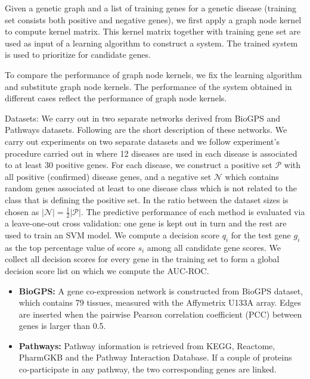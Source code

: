 \documentclass[review]{elsarticle}
\begin{document}
Given a genetic graph and a list of training genes for a genetic disease (training set consists both positive and negative genes), we first apply  a graph node kernel to compute kernel matrix. This kernel matrix together with training gene set are used as input of a learning algorithm to construct a system. The trained system is used to prioritize for candidate genes.

To compare the performance of graph node kernels, we fix the learning algorithm and substitute graph node kernels. The performance of the system obtained in different cases reflect the performance of graph node kernels.




Datasets: We carry out in two separate networks derived from BioGPS and Pathways datasets. Following are the short description of these networks.
We carry out experiments on two separate datasets and we follow experiment's procedure carried out in \cite{chen2014disease} where 
12 diseases \cite{goh2007human} are used in each disease is associated to at least 30 positive genes. For each disease, we construct a positive set $\mathcal{P}$ with all positive (confirmed) disease genes, and a negative set $\mathcal{N}$ which contains random genes associated at least to one disease class which is not related to the class that is defining the positive set. In \cite{chen2014disease} the ratio between the dataset sizes is chosen as $\vert \mathcal{N} \vert = \frac{1}{2} \vert \mathcal{P} \vert$. The predictive performance of each method is evaluated via a leave-one-out cross validation: one gene is kept out in turn and the rest are used to train an SVM model. We compute a decision score $q_i$ for the test gene $g_i$ as the top percentage value of score $s_i$ among all candidate gene scores. We collect all decision scores for every gene in the training set to form a global decision score list on which we compute the AUC-ROC.

\begin{itemize}
\item \textbf{BioGPS:} A gene co-expression network is constructed from BioGPS dataset, which contains 79 tissues, measured with the Affymetrix U133A array. Edges are inserted when the pairwise Pearson correlation coefficient (PCC) between genes is larger than 0.5.

\item \textbf{Pathways:} Pathway information is retrieved from KEGG, Reactome, PharmGKB and the Pathway Interaction Database. If a couple of proteins co-participate in any pathway, the two corresponding genes are linked.  
\end{itemize}
\end{document}
